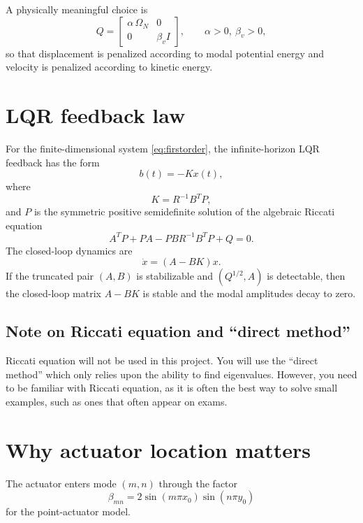 \documentclass[11pt]{article}
\begin{document}
A physically meaningful choice is
\begin{equation}
\label{eq:Qchoice}
Q=
\begin{bmatrix}
\alpha\,\Omega_N & 0 \\
0 & \beta_v I
\end{bmatrix},
\qquad \alpha>0,\ \beta_v>0,
\end{equation}
so that displacement is penalized according to modal potential energy 
and velocity is penalized according to kinetic energy.

\section{LQR feedback law}
For the finite-dimensional system \eqref{eq:firstorder}, the 
infinite-horizon LQR feedback has the form
\begin{equation}
\label{eq:lqr-law}
 b(t)=-Kx(t),
\end{equation}
where
\begin{equation}
\label{eq:gain}
K=R^{-1}B^T P,
\end{equation}
and $P$ is the symmetric positive semidefinite solution of the 
algebraic Riccati equation
\begin{equation}
\label{eq:ARE}
A^T P + P A - P B R^{-1} B^T P + Q = 0.
\end{equation}
The closed-loop dynamics are
\begin{equation}
\label{eq:closedloop}
\dot x = (A-BK)x.
\end{equation}
If the truncated pair $(A,B)$ is stabilizable and $(Q^{1/2},A)$ is 
detectable, then the closed-loop matrix $A-BK$ is stable and the 
modal amplitudes decay to zero.

\subsection{Note on Riccati equation and ``direct method''}
Riccati equation will not be used in this project. You will use
the ``direct method'' which only relies upon the ability to
find eigenvalues. However, you need to be familiar with Riccati
equation, as it is often the best way to solve small examples,
such as ones that often appear on exams.

\section{Why actuator location matters}
The actuator enters mode $(m,n)$ through the factor
\[
\beta_{mn}=2\sin(m\pi x_0)\sin(n\pi y_0)
\]
for the point-actuator model.
\end{document}
